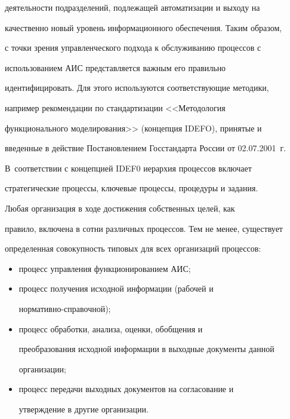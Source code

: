 деятельности подразделений, подлежащей автоматизации и выходу на 


качественно новый уровень информационного обеспечения. Таким образом, 


с точки зрения управленческого подхода к обслуживанию процессов с 


использованием АИС представляется важным его правильно 


идентифицировать. Для этого используются соответствующие методики, 


например рекомендации по стандартизации <<Методология 


функционального моделирования>> (концепция IDEFO), принятые и 


введенные в действие Постановлением Госстандарта России от 02.07.2001~г. 


В~соответствии с концепцией IDEF0 иерархия процессов включает 


стратегические процессы, ключевые процессы, процедуры и задания.


       


       Любая организация в ходе достижения собственных целей, как 


правило, включена в сотни различных процессов. Тем не менее, существует 


определенная совокупность типовых для всех организаций  процессов:


       \begin{itemize}


       \item процесс управления функционированием АИС;


       \item процесс получения исходной информации (рабочей и 


       нор\-ма\-тив\-но-спра\-вочной);


       \item процесс обработки, анализа, оценки, обобщения и 


преобразования исходной информации в выходные документы данной 


организации;


       \item процесс передачи выходных документов на согласование и 


утверждение в другие организации.


       \end{itemize}


